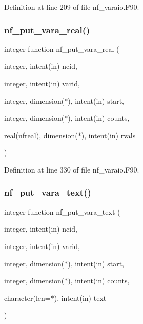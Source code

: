 Definition at line 209 of file nf\+\_\+varaio.\+F90.

\mbox{\label{nf__varaio_8F90_aa114940bfd72bbafd6c3fe900381a29a}} 
\subsubsection{\texorpdfstring{nf\+\_\+put\+\_\+vara\+\_\+real()}{nf\_put\_vara\_real()}}
{\footnotesize\ttfamily integer function nf\+\_\+put\+\_\+vara\+\_\+real (\begin{DoxyParamCaption}\item[{integer, intent(in)}]{ncid,  }\item[{integer, intent(in)}]{varid,  }\item[{integer, dimension($\ast$), intent(in)}]{start,  }\item[{integer, dimension($\ast$), intent(in)}]{counts,  }\item[{real(nfreal), dimension($\ast$), intent(in)}]{rvals }\end{DoxyParamCaption})}



Definition at line 330 of file nf\+\_\+varaio.\+F90.

\mbox{\label{nf__varaio_8F90_a582dd86e95ea89b621ae3bdac16b0961}} 
\subsubsection{\texorpdfstring{nf\+\_\+put\+\_\+vara\+\_\+text()}{nf\_put\_vara\_text()}}
{\footnotesize\ttfamily integer function nf\+\_\+put\+\_\+vara\+\_\+text (\begin{DoxyParamCaption}\item[{integer, intent(in)}]{ncid,  }\item[{integer, intent(in)}]{varid,  }\item[{integer, dimension($\ast$), intent(in)}]{start,  }\item[{integer, dimension($\ast$), intent(in)}]{counts,  }\item[{character(len=$\ast$), intent(in)}]{text }\end{DoxyParamCaption})}




